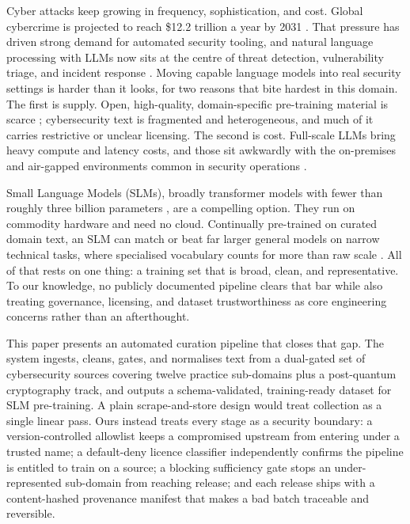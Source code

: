 \documentclass[conference]{IEEEtran}
\begin{document}
Cyber attacks keep growing in frequency, sophistication, and cost.
Global cybercrime is projected to reach \$12.2 trillion a year by 2031
\cite{braue2025cybercrime}. That pressure has driven strong demand for
automated security tooling, and natural language processing with LLMs
now sits at the centre of threat detection, vulnerability triage, and
incident response \cite{zhang2025llms}. Moving capable language models
into real security settings is harder than it looks, for two reasons
that bite hardest in this domain. The first is supply. Open,
high-quality, domain-specific pre-training material is scarce
\cite{yu2025primus}; cybersecurity text is fragmented and heterogeneous,
and much of it carries restrictive or unclear licensing. The second is
cost. Full-scale LLMs bring heavy compute and latency costs, and those
sit awkwardly with the on-premises and air-gapped environments common in
security operations \cite{levi2025cyberpal}.

Small Language Models (SLMs), broadly transformer models with fewer
than roughly three billion parameters \cite{minaee2024llm}, are a
compelling option. They run on commodity hardware and need no cloud.
Continually pre-trained on curated domain text, an SLM can match or beat
far larger general models on narrow technical tasks, where specialised
vocabulary counts for more than raw scale \cite{bayer2024cysecbert,
ferrag2024revolutionising}. All of that rests on one thing: a training
set that is broad, clean, and representative. To our knowledge, no
publicly documented pipeline clears that bar while also treating
governance, licensing, and dataset trustworthiness as core engineering
concerns rather than an afterthought.

This paper presents an automated curation pipeline that closes that
gap. The system ingests, cleans, gates, and normalises text from a
dual-gated set of cybersecurity sources covering twelve practice
sub-domains plus a post-quantum cryptography track, and outputs a
schema-validated, training-ready dataset for SLM pre-training. A plain
scrape-and-store design would treat collection as a single linear pass.
Ours instead treats every stage as a security boundary: a
version-controlled allowlist keeps a compromised upstream from entering
under a trusted name; a default-deny licence classifier independently
confirms the pipeline is entitled to train on a source; a blocking
sufficiency gate stops an under-represented sub-domain from reaching
release; and each release ships with a content-hashed provenance
manifest that makes a bad batch traceable and reversible.
\end{document}
